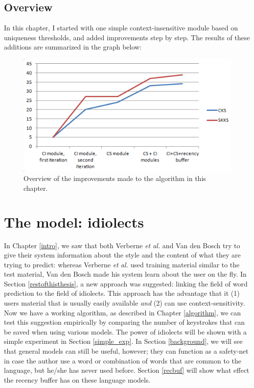\documentclass[11pt]{article}
\begin{document}
\subsection{Overview}
In this chapter, I started with one simple context-insensitive module based on uniqueness thresholds, and added improvements step by step. The results of these additions are summarized in the graph below:

\begin{figure}[H] \centering
\includegraphics[scale=1]{overview}
\caption{Overview of the improvements made to the algorithm in this chapter.}
\label{overview}
\end{figure} 






\section{The model: idiolects} \label{model}

In Chapter \ref{intro}, we saw that both Verberne {\em et al.}  and Van den Bosch  try to give their system information about the style and the content of what they are trying to predict: whereas Verberne {\em et al.}  used training material similar to the test material, Van den Bosch  made his system learn about the user on the fly. In Section \ref{restofthisthesis}, a new approach was suggested: linking the field of word prediction to the field of idiolects. This approach has the advantage that it (1) users material that is usually easily available \emph{and} (2) can use context-sensitivity. Now we have a working algorithm, as described in Chapter \ref{algorithm}, we can test this suggestion empirically by comparing the number of keystrokes that can be saved when using various models. The power of idiolects will be shown with a simple experiment in Section \ref{simple_exp}. In Section \ref{background}, we will see that general models can still be useful, however; they can function as a safety-net in case the author use a word or combination of words that are common to the language, but he/she has never used before. Section \ref{recbuf} will show what effect the recency buffer has on these language models.
\end{document}
